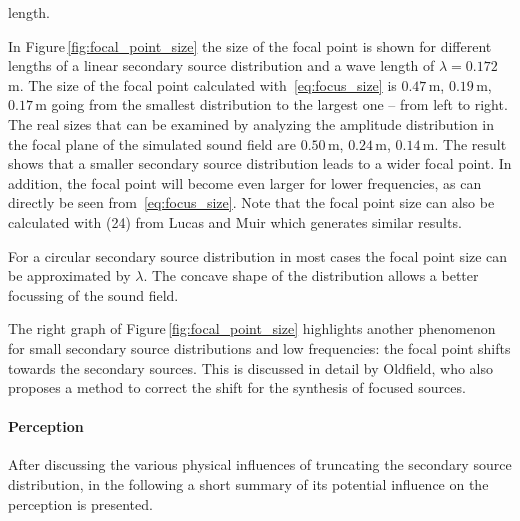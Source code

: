length.
%
\begin{figure*}[t]
    \small
    
    \caption{Sound pressure of a focused source synthesized with
    \twohalfD \ac{WFS}~\protect\eqref{eq:D_wfs_fs_25D}.
    Three different linear secondary source distributions were
    applied, ranging from $10$\,m to $0.75$\,m. In white the size of the focal
    point as given by $\Delta_{\text{s},\,\text{linear}}$ is
    indicated. Parameters: $\xs = (0,-1,0)$\,m, $\xref = (0,-2,0)$\,m, $f =
    2000$\,Hz.
    }
    \label{fig:focal_point_size}
\end{figure*}
%
In Figure\,\ref{fig:focal_point_size} the size of the focal point is shown
for different lengths of a linear secondary source distribution and a wave
length of $\lambda = 0.172$\,m. The size of the focal point calculated
with~\eqref{eq:focus_size} is
$0.47$\,m, $0.19$\,m, $0.17$\,m going from the smallest distribution to the
largest one -- from left to right. The real sizes that can be examined by analyzing the
amplitude distribution in the focal plane of the simulated sound field
are $0.50$\,m, $0.24$\,m, $0.14$\,m.
The result shows that a smaller secondary source distribution leads to a wider
focal point. In addition, the focal point will become even larger for lower
frequencies, as can directly be seen from~\eqref{eq:focus_size}.
Note that the focal point size can also be calculated with (24) from Lucas
and Muir which generates similar results.

For a circular secondary source distribution in most cases the focal point size
can be approximated by $\lambda$. The concave shape of the distribution allows
a better focussing of the sound field.

The right graph of Figure\,\ref{fig:focal_point_size} highlights another phenomenon for small
secondary source distributions and low frequencies: the focal point
shifts towards the secondary sources. This is discussed in detail by
Oldfield,\autocite[][Sect.\,4.9]{Oldfield2013} who also proposes a method to
correct the shift for the synthesis of focused sources.


\paragraph{Perception}
%
After discussing the various physical influences of truncating the secondary
source distribution, in the following a short summary of its potential influence on the
perception is presented.

